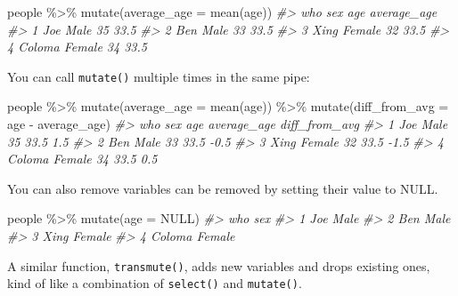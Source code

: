 \documentclass[
]{book}
\newenvironment{Shaded}{\begin{snugshade}}{\end{snugshade}}
\newcommand{\AttributeTok}[1]{\textcolor[rgb]{0.77,0.63,0.00}{#1}}
\newcommand{\CommentTok}[1]{\textcolor[rgb]{0.56,0.35,0.01}{\textit{#1}}}
\newcommand{\ConstantTok}[1]{\textcolor[rgb]{0.00,0.00,0.00}{#1}}
\newcommand{\FunctionTok}[1]{\textcolor[rgb]{0.00,0.00,0.00}{#1}}
\newcommand{\NormalTok}[1]{#1}
\newcommand{\SpecialCharTok}[1]{\textcolor[rgb]{0.00,0.00,0.00}{#1}}
\begin{document}
\begin{Shaded}
\begin{Highlighting}[]
\NormalTok{people }\SpecialCharTok{\%\textgreater{}\%} \FunctionTok{mutate}\NormalTok{(}\AttributeTok{average\_age =} \FunctionTok{mean}\NormalTok{(age))}
\CommentTok{\#\textgreater{}      who    sex age average\_age}
\CommentTok{\#\textgreater{} 1    Joe   Male  35        33.5}
\CommentTok{\#\textgreater{} 2    Ben   Male  33        33.5}
\CommentTok{\#\textgreater{} 3   Xing Female  32        33.5}
\CommentTok{\#\textgreater{} 4 Coloma Female  34        33.5}
\end{Highlighting}
\end{Shaded}

You can call \texttt{mutate()} multiple times in the same pipe:

\begin{Shaded}
\begin{Highlighting}[]
\NormalTok{people }\SpecialCharTok{\%\textgreater{}\%} \FunctionTok{mutate}\NormalTok{(}\AttributeTok{average\_age =} \FunctionTok{mean}\NormalTok{(age)) }\SpecialCharTok{\%\textgreater{}\%}
  \FunctionTok{mutate}\NormalTok{(}\AttributeTok{diff\_from\_avg =}\NormalTok{ age }\SpecialCharTok{{-}}\NormalTok{ average\_age)}
\CommentTok{\#\textgreater{}      who    sex age average\_age diff\_from\_avg}
\CommentTok{\#\textgreater{} 1    Joe   Male  35        33.5           1.5}
\CommentTok{\#\textgreater{} 2    Ben   Male  33        33.5          {-}0.5}
\CommentTok{\#\textgreater{} 3   Xing Female  32        33.5          {-}1.5}
\CommentTok{\#\textgreater{} 4 Coloma Female  34        33.5           0.5}
\end{Highlighting}
\end{Shaded}

You can also remove variables can be removed by setting their value to NULL.

\begin{Shaded}
\begin{Highlighting}[]
\NormalTok{people }\SpecialCharTok{\%\textgreater{}\%} \FunctionTok{mutate}\NormalTok{(}\AttributeTok{age =} \ConstantTok{NULL}\NormalTok{)}
\CommentTok{\#\textgreater{}      who    sex}
\CommentTok{\#\textgreater{} 1    Joe   Male}
\CommentTok{\#\textgreater{} 2    Ben   Male}
\CommentTok{\#\textgreater{} 3   Xing Female}
\CommentTok{\#\textgreater{} 4 Coloma Female}
\end{Highlighting}
\end{Shaded}

A similar function, \texttt{transmute()}, adds new variables and drops existing ones, kind of like a combination of \texttt{select()} and \texttt{mutate()}.
\end{document}
